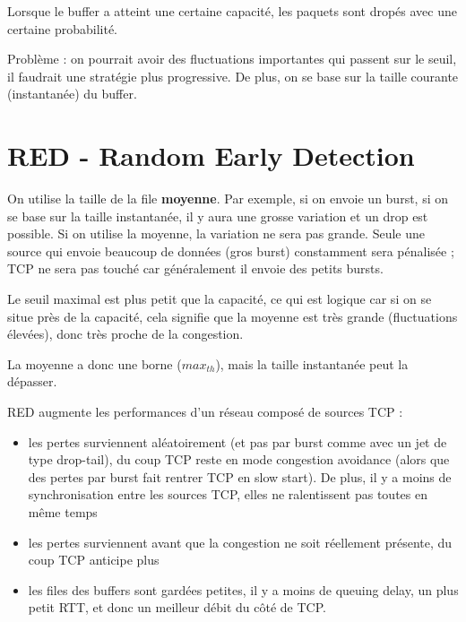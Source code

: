 			Lorsque le buffer a atteint une certaine capacité, les paquets sont dropés avec une certaine probabilité.
			
			
			Problème : on pourrait avoir des fluctuations importantes qui passent sur le seuil, il faudrait une stratégie plus progressive. De plus, on se base sur la taille courante (instantanée) du buffer.
			
			\section{RED - Random Early Detection}
		
			
			On utilise la taille de la file \textbf{moyenne}. Par exemple, si on envoie un burst, si on se base sur la taille instantanée, il y aura une grosse variation et un drop est possible. Si on utilise la moyenne, la variation ne sera pas grande. Seule une source qui envoie beaucoup de données (gros burst) constamment sera pénalisée ; TCP ne sera pas touché car généralement il envoie des petits bursts.
			
			Le seuil maximal est plus petit que la capacité, ce qui est logique car si on se situe près de la capacité, cela signifie que la moyenne est très grande (fluctuations élevées), donc très proche de la congestion.
			
			La moyenne a donc une borne ($max_{th}$), mais la taille instantanée peut la dépasser.
			
			RED augmente les performances d'un réseau composé de sources TCP :
			
			\begin{itemize}
				\item les pertes surviennent aléatoirement (et pas par burst comme avec un jet de type drop-tail), du coup TCP reste en mode congestion avoidance (alors que des pertes par burst fait rentrer TCP en slow start). De plus, il y a moins de synchronisation entre les sources TCP, elles ne ralentissent pas toutes en même temps
				
				\item les pertes surviennent avant que la congestion ne soit réellement présente, du coup TCP anticipe plus
				\item les files des buffers sont gardées petites, il y a moins de queuing delay, un plus petit RTT, et donc un meilleur débit du côté de TCP.
			\end{itemize}
			
